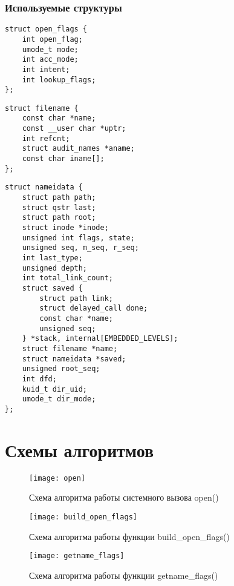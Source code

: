 \subsubsection*{\large Используемые структуры}
\begin{lstlisting}[caption=Структура open\_flags]
struct open_flags {
	int open_flag;
	umode_t mode;
	int acc_mode;
	int intent;
	int lookup_flags;
};
\end{lstlisting}

\begin{lstlisting}[caption=Структура filename]
struct filename {
	const char *name;
	const __user char *uptr;
	int refcnt;
	struct audit_names *aname;
	const char iname[];
};	
\end{lstlisting}

\begin{lstlisting}[caption=Структура nameidata]
struct nameidata {
	struct path path;
	struct qstr last;
	struct path root;
	struct inode *inode;
	unsigned int flags, state;
	unsigned seq, m_seq, r_seq;
	int last_type;
	unsigned depth;
	int total_link_count;
	struct saved {
		struct path link;
		struct delayed_call done;
		const char *name;
		unsigned seq;
	} *stack, internal[EMBEDDED_LEVELS];
	struct filename	*name;
	struct nameidata *saved;
	unsigned root_seq;
	int dfd;
	kuid_t dir_uid;
	umode_t dir_mode;
};	
\end{lstlisting}



\section*{Схемы алгоритмов}

\begin{figure}[ht!]
	\centering
	\texttt{[image: open]}
	\caption{Схема алгоритма работы системного вызова open()}
\end{figure}

\pagebreak

\begin{figure}[ht!]
	\centering
	\texttt{[image: build\_open\_flags]}
	\caption{Схема алгоритма работы функции build\_open\_flags()}
\end{figure}

\pagebreak

\begin{figure}[ht!]
	\centering
	\texttt{[image: getname\_flags]}
	\caption{Схема алгоритма работы функции getname\_flags()}
\end{figure}

